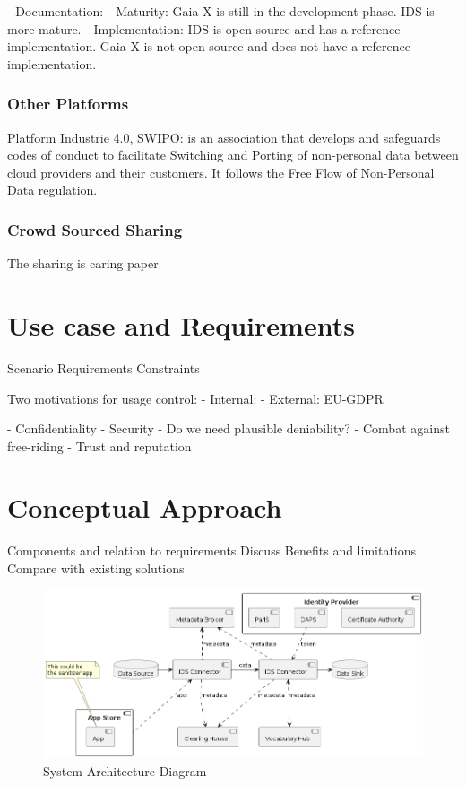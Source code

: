 \documentclass{article}
\begin{document}
- Documentation: 
- Maturity: Gaia-X is still in the development phase. IDS is more mature.
- Implementation: IDS is open source and has a reference implementation. Gaia-X is not open source and does not have a reference implementation.



\subsubsection*{Other Platforms}
Platform Industrie 4.0, 
SWIPO: is an association that develops and safeguards codes of conduct to facilitate Switching and Porting of non-personal data between cloud providers and their customers.
It follows the Free Flow of Non-Personal Data regulation.

\subsubsection*{Crowd Sourced Sharing}
The sharing is caring paper \cite{jesus_sharing_2023}


\section{Use case and Requirements} %
Scenario
Requirements
Constraints

Two motivations for usage control:
- Internal: 
- External: EU-GDPR


- Confidentiality
- Security
- Do we need plausible deniability?
- Combat against free-riding
- Trust and reputation


\section{Conceptual Approach} %

Components and relation to requirements
Discuss Benefits and limitations
Compare with existing solutions

\begin{figure}[h]
    \centering
    \includegraphics[width=\textwidth]{components}
    \caption{System Architecture Diagram}
    \label{fig:system-architecture}
\end{figure}
\end{document}
